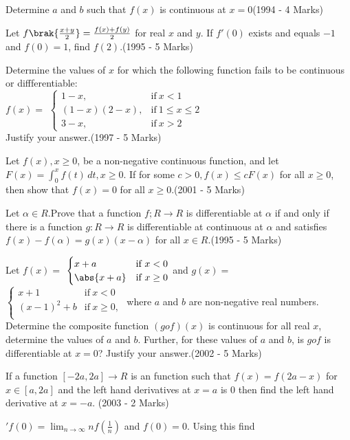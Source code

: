 Determine $a$ and $b$ such that $f(x)$ is continuous at $x=0$\hfill (1994 - 4 Marks)
\item  Let $f\brak{\frac{x+y}{2}} = \frac{f(x)+f(y)}{2}$ for real $x$ and $y$. If  $f'(0)$ exists and equals $-1$ and $f(0)=1$, find $f(2)$.\hfill (1995 - 5 Marks)
\item Determine the values of $x$ for which the following function fails to be continuous or diffferentiable:\\
$f(x) =$
$\begin{cases}
    1 - x, & \text{if}\ x<1\\
    (1-x)(2-x), & \text{if}\ 1 \leq x \leq 2\\
    3-x, & \text{if}\ x>2
\end{cases}$\\
Justify your answer.\hfill (1997 - 5 Marks)
\item Let $f(x),x\geq 0$, be a non-negative continuous function, and let $F(x) = \int_{0}^{x} f(t) \, dt, x \geq 0$. If for some $c>0,f(x) \leq cF(x)$ for all $x \geq 0$, then show that $f(x)=0$ for all $x \geq 0$.\hfill (2001 - 5 Marks)
\item Let $\alpha \in R$.Prove that a function $f;R\rightarrow R$ is differentiable at $\alpha$ if and only if there is a function $g:R \rightarrow R$ is differentiable at continuous at $\alpha$ and satisfies $f(x)-f(\alpha)=g(x)(x-\alpha)$ for all $x \in R$.\hfill (1995 - 5 Marks)
\item Let $f(x) = $ 
$\begin{cases}
    x + a & \text{if}\ x < 0\\
	\abs{x + a}& \text{if}\ x \geq 0
\end{cases}$
and 
$g(x) = $
$\begin{cases}
    x + 1 & \text{if}\ x < 0\\
    (x - 1)^2 + b & \text{if}\ x \geq 0,\\
     \end{cases}$
      where $a$ and $b$ are non-negative real numbers. Determine the composite function $(gof)(x)$ is continuous for all real $x$, determine the values of $a$ and $b$. Further, for these values of $a$ and $b$, is $gof$ is differentiable at $x = 0$? Justify your answer.\hfill (2002 - 5 Marks)
\item If a function $[-2a , 2a]\rightarrow R$ is an function such that $f(x) = f(2a - x)$ for $x \in [a , 2a]$ and the left hand derivatives at $x = a$ is $0$ then find the left hand derivative at $x = -a$.
	\hfill (2003 - 2 Marks)
\item $\prime{f(0)} = \lim_{n \to \infty} nf(\frac{1}{n})$ and $f(0) = 0$. Using this find\\
